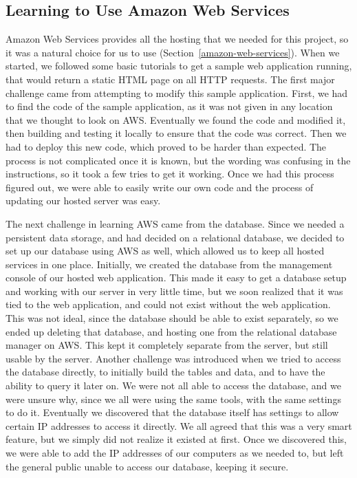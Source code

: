 \documentclass[12pt]{report}
\let\Oldsubsection\subsection
\renewcommand{\subsection}{\FloatBarrier\Oldsubsection}
\begin{document}

\subsection{Learning to Use Amazon Web Services} \label{learning-to-use-amazon-web-services}

Amazon Web Services provides all the hosting that we needed for this project, so it was a
natural choice for us to use (Section~\ref{amazon-web-services}). When we started, we followed
some basic tutorials to get a sample
web application running, that would return a static HTML page on all HTTP requests. The first
major challenge came from attempting to modify this sample application. First, we had to find
the code of the sample application, as it was not given in any location that we thought to look on
AWS. Eventually we found the code and modified it, then building and testing it locally to
ensure that the code was correct. Then we had to deploy this new code, which proved to be
harder than expected. The process is not complicated once it is known, but the wording was
confusing in the instructions, so it took a few tries to get it working. Once we had this process
figured out, we were able to easily write our own code and the process of updating our hosted
server was easy.

The next challenge in learning AWS came from the database. Since we needed a
persistent data storage, and had decided on a relational database, we decided to set up our
database using AWS as well, which allowed us to keep all hosted services in one place. Initially,
we created the database from the management console of our hosted web application. This made
it easy to get a database setup and working with our server in very little time, but we soon
realized that it was tied to the web application, and could not exist without the web application.
This was not ideal, since the database should be able to exist separately, so we ended up deleting
that database, and hosting one from the relational database manager on AWS. This kept it
completely separate from the server, but still usable by the server. Another challenge was
introduced when we tried to access the database directly, to initially build the tables and data,
and to have the ability to query it later on. We were not all able to access the database, and we
were unsure why, since we all were using the same tools, with the same settings to do it.
Eventually we discovered that the database itself has settings to allow certain IP addresses to
access it directly. We all agreed that this was a very smart feature, but we simply did not realize
it existed at first. Once we discovered this, we were able to add the IP addresses of our
computers as we needed to, but left the general public unable to access our database, keeping it
secure.
\end{document}
